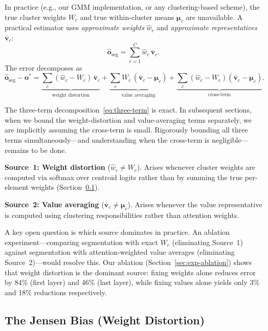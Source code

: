\documentclass[11pt,a4paper]{article}
\theoremstyle{definition}
\newcommand{\vv}{\mathbf{v}}
\newcommand{\oo}{\mathbf{o}}
\newcommand{\bmu}{\boldsymbol{\mu}}
\begin{document}
In practice (e.g., our GMM implementation, or any clustering-based scheme),
the true cluster weights $W_c$ and true within-cluster means $\bmu_c$
are unavailable.  A practical estimator uses
\emph{approximate weights} $\hat{w}_c$ and \emph{approximate representatives}
$\bar{\vv}_c$:
\begin{equation}\label{eq:seg-practical}
  \hat{\oo}_{\mathrm{seg}} = \sum_{c=1}^{C}\hat{w}_c\,\bar{\vv}_c.
\end{equation}
The error decomposes as
\begin{equation}\label{eq:three-term}
  \hat{\oo}_{\mathrm{seg}} - \oo^{*}
  = \underbrace{\sum_c(\hat{w}_c - W_c)\,\bar{\vv}_c}_{\text{weight distortion}}
  + \underbrace{\sum_c W_c\,(\bar{\vv}_c - \bmu_c)}_{\text{value averaging}}
  + \underbrace{\sum_c(\hat{w}_c - W_c)(\bar{\vv}_c - \bmu_c)}_{\text{cross-term}}.
\end{equation}

\begin{researchnote}
The three-term decomposition~\eqref{eq:three-term} is exact.  In subsequent
sections, when we bound the weight-distortion and value-averaging terms
separately, we are implicitly assuming the cross-term is small.  Rigorously
bounding all three terms simultaneously---and understanding when the
cross-term is negligible---remains to be done.
\end{researchnote}

\textbf{Source~1: Weight distortion} ($\hat{w}_c \ne W_c$).
Arises whenever cluster weights are computed via softmax over centroid logits
rather than by summing the true per-element weights (Section~\ref{sec:jensen}).

\textbf{Source~2: Value averaging} ($\bar{\vv}_c \ne \bmu_c$).
Arises whenever the value representative is computed using clustering
responsibilities rather than attention weights.

A key open question is which source dominates in practice. An ablation
experiment---comparing segmentation with exact $W_c$ (eliminating Source~1)
against segmentation with attention-weighted value averages (eliminating
Source~2)---would resolve this.
Our ablation (Section~\ref{sec:exp-ablation}) shows that weight distortion is
the dominant source: fixing weights alone reduces error by 84\% (first layer)
and 46\% (last layer), while fixing values alone yields only 3\% and 18\%
reductions respectively.

\subsection{The Jensen Bias (Weight Distortion)}\label{sec:jensen}
\end{document}
